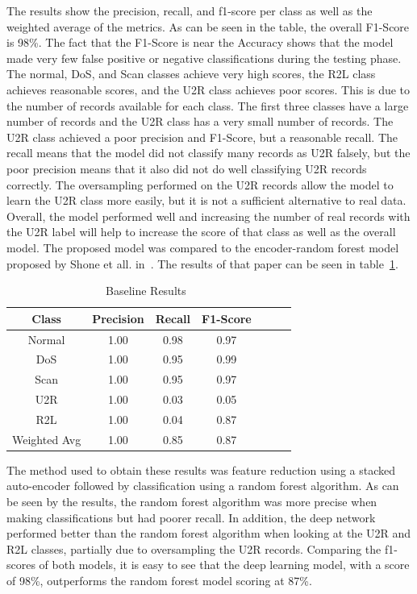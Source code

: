 \documentclass{article}
\begin{document}
The results show the precision, recall, and f1-score per class as well as the weighted average of the metrics. As can be seen in the table, the overall F1-Score is 98\%. The fact that the F1-Score is near the Accuracy shows that the model made very few false positive or negative classifications during the testing phase. The normal, DoS, and Scan classes achieve very high scores, the R2L class achieves reasonable scores, and the U2R class achieves poor scores. This is due to the number of records available for each class. The first three classes have a large number of records and the U2R class has a very small number of records. The U2R class achieved a poor precision and F1-Score, but a reasonable recall. The recall means that the model did not classify many records as U2R falsely, but the poor precision means that it also did not do well classifying U2R records correctly. The oversampling performed on the U2R records allow the model to learn the U2R class more easily, but it is not a sufficient alternative to real data. Overall, the model performed well and increasing the number of real records with the U2R label will help to increase the score of that class as well as the overall model. The proposed model was compared to the encoder-random forest model proposed by Shone et all. in~\cite{baseline1}. The results of that paper can be seen in table~\ref{tab:model-comparison}.

\begin{table}[!h]
\centering
\begin{tabular}{ |c|c|c|c|c|c|c| }
  \hline
  Class & Precision & Recall & F1-Score \\
  \hline
  Normal & 1.00 & 0.98 & 0.97 \\
  DoS    & 1.00 & 0.95 & 0.99 \\
  Scan   & 1.00 & 0.95 & 0.97 \\
  U2R    & 1.00 & 0.03 & 0.05 \\
  R2L    & 1.00 & 0.04 & 0.87 \\
  \hline
  Weighted Avg  & 1.00 & 0.85 & 0.87 \\
  \hline
\end{tabular}
\caption{Baseline Results~\cite{baseline1}}
\label{tab:model-comparison}
\end{table}

The method used to obtain these results was feature reduction using a stacked auto-encoder followed by classification using a random forest algorithm. As can be seen by the results, the random forest algorithm was more precise when making classifications but had poorer recall. In addition, the deep network performed better than the random forest algorithm when looking at the U2R and R2L classes, partially due to oversampling the U2R records. Comparing the f1-scores of both models, it is easy to see that the deep learning model, with a score of 98\%, outperforms the random forest model scoring at 87\%.
\end{document}

